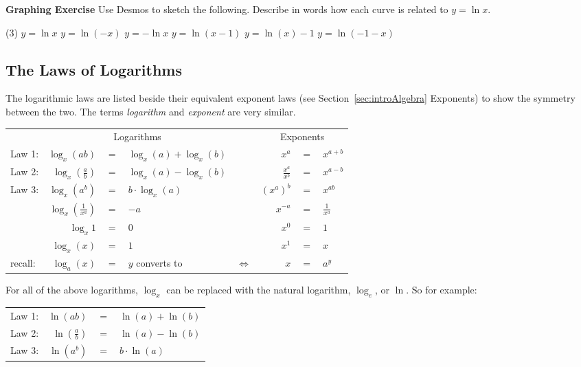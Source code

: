 \textbf{Graphing Exercise}
Use Desmos to sketch the following. Describe in words how each curve is related to $y =\ln  x$. 

\begin{tasks}(3)
	\task $y =\ln  x$ 
\task  $y =\ln  ( -x)$ 
\task  $y = -\ln  x$ 
	\task  $y =\ln  (x -1)$ 
	\task  $y =\ln  (x) -1$ 
	\task $y =\ln  ( -1 -x)$ \end{tasks}


\subsection*{The Laws of Logarithms}

The logarithmic laws are listed beside their equivalent exponent laws (see Section~\ref{sec:introAlgebra} Exponents) to show the symmetry between the two. The terms \textit{logarithm} and \textit{exponent} are very similar.
\begin{tcolorbox}
\begin{center}
\renewcommand{\arraystretch}{1.2}
\begin{tabular}{lrclcrcl}
	\toprule
	&\multicolumn{3}{c}{Logarithms}& &\multicolumn{3}{c}{Exponents}\\
	\cmidrule{1-4}\cmidrule{6-8}
	Law 1: &$ \log_x(ab) $&$=$&$ \log_x(a)+\log_x(b)  $&\hspace{1cm} &$x^a$&$=$&$x^{a+b} $\\
	Law 2: &$ \log_x\left(\frac{a}{b}\right) $&$=$&$  \log_x(a)-\log_x(b) $& &$\frac{x^a}{x^b}$&$=$&$x^{a-b}  $\\
	Law 3: &$ \log_x(a^b) $&$=$&$ b\cdot\log_x(a)   $& &$(x^a)^b $&$=$&$x^{ab} $\\
	\cmidrule{1-4}\cmidrule{6-8}
	&$  \log_{x}\left(\frac{1}{x^a}\right) $&$=$&$-a   $& &$x^{-a} $&$=$&$\frac{1}{x^a} $\\
	&$ \log_{x}1  $&$=$&$ 0  $& &$x^0 $&$=$&$1 $\\
	&$ \log_x(x) $&$=$&$  1 $& &$x^1 $&$=$&$x $\\
	\bottomrule
	recall:&$ \log_a(x) $&$=$&$y$\hspace{0.5cm} converts to& $\Leftrightarrow$ &$x $&$=$&$a^y $\\
	\bottomrule
\end{tabular}
\end{center}
For all of the above logarithms, $\log_x$ can be replaced with the natural logarithm, $\log_e$,  or $\ln$. So for example:
\begin{center}
	\renewcommand{\arraystretch}{1.2}
	\begin{tabular}{lrcl}
		\toprule
		Law 1: &$ \ln(ab) $&$=$&$ \ln(a)+\ln(b)  $\\
		Law 2: &$ \ln\left(\frac{a}{b}\right) $&$=$&$  \ln(a)-\ln(b) $\\
		Law 3: &$ \ln(a^b) $&$=$&$ b\cdot\ln(a)$ \\
		\bottomrule
	\end{tabular}
\end{center}
\end{tcolorbox}
